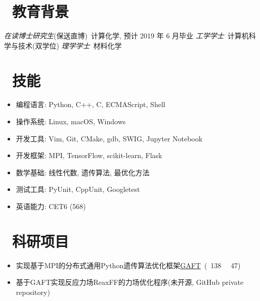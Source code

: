 \documentclass{resume}
\begin{document}


 
\section{\faGraduationCap\  教育背景}
\textit{在读博士研究生}(保送直博)\ 计算化学, 预计 2019 年 6 月毕业
\textit{工学学士}\ 计算机科学与技术(双学位)
\textit{理学学士}\ 材料化学

\section{\faCogs\ 技能}
\begin{itemize}[parsep=0.5ex]
  \item 编程语言: Python, C++, C, ECMAScript, Shell
  \item 操作系统: Linux, macOS, Windows
  \item 开发工具: Vim, Git, CMake, gdb, SWIG, Jupyter Notebook
  \item 开发框架: MPI, TensorFlow, scikit-learn, Flask
  \item 数学基础: 线性代数, 遗传算法, 最优化方法
  \item 测试工具: PyUnit, CppUnit, Googletest
  \item 英语能力: CET6 (568)
\end{itemize}

\section{\faUsers\ 科研项目}

\begin{onehalfspacing}
\begin{itemize}
    \item 实现基于MPI的分布式通用Python遗传算法优化框架\faLink \href{https://github.com/PytLab/gaft}{GAFT}\ (\faStar\ 138 \ \faCodeFork\ 47)
    \item 基于GAFT实现反应力场ReaxFF的力场优化程序(未开源, GitHub private repository)
\end{itemize}
\end{onehalfspacing}
\end{document}
